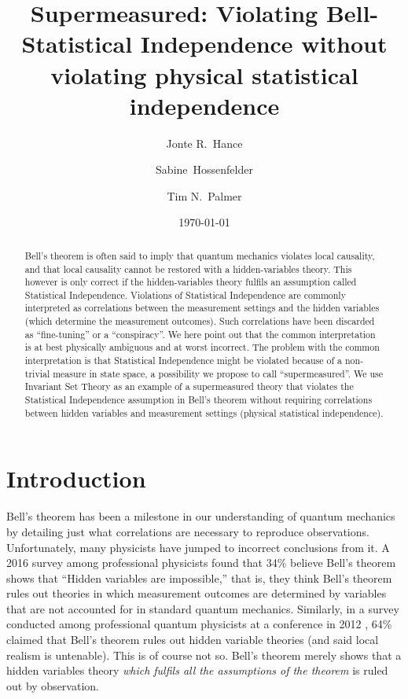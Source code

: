 \documentclass{article}
\begin{document}
\title{Supermeasured: Violating Bell-Statistical Independence without violating physical statistical independence}
\author[1,*]{Jonte R.\ Hance}
\author[2]{Sabine\ Hossenfelder}
\author[3,$\dagger$]{Tim N.\ Palmer}
\date{\today}

\maketitle

\begin{abstract}
Bell's theorem is often said to imply that quantum mechanics violates local causality, and that local causality cannot be restored with a hidden-variables theory. This however is only correct if the hidden-variables theory fulfils an assumption called Statistical Independence. Violations of Statistical Independence are commonly interpreted as correlations between the measurement settings and the hidden variables (which determine the measurement outcomes). Such correlations have been discarded as ``fine-tuning'' or a ``conspiracy''. We here point out that the common interpretation is at best physically ambiguous and at worst incorrect. The problem with the common interpretation is that Statistical Independence might be violated because of a non-trivial measure in state space, a possibility we propose to call ``supermeasured''. We use Invariant Set Theory as an example of a supermeasured theory that violates the Statistical Independence assumption in Bell's theorem without requiring correlations between hidden variables and measurement settings (physical statistical independence). 
\end{abstract}

\section{Introduction}
\label{intro}
Bell's theorem \cite{Bell1964OnEPR} has been a milestone in our understanding of quantum mechanics by detailing just what correlations are necessary to reproduce observations. Unfortunately, many physicists have jumped to incorrect conclusions from it. A 2016 survey among professional physicists \cite{Sujeevan2016Survey} found that 34\% believe Bell's theorem shows that ``Hidden variables are impossible,'' that is, they think Bell's theorem rules out theories in which measurement outcomes are determined by variables that are not accounted for in standard quantum mechanics. Similarly, in a survey conducted among professional quantum physicists at a conference in 2012 \cite{Schlosshauer2013Attitudes}, 64\% claimed that Bell's theorem rules out hidden variable theories (and said local realism is untenable). This is of course not so. Bell's theorem merely shows that a hidden variables theory {\emph{which fulfils all the assumptions of the theorem}} is ruled out by observation.
\end{document}
